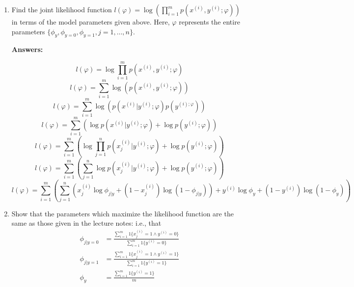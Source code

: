 \documentclass[a4paper,14pt]{article}
\begin{document}
\begin{enumerate}[label=(\alph*)]
    \item Find the joint likelihood function $l(\varphi) = \log \left(\prod_{i=1}^{m}p(x^{(i)},y^{(i)};\varphi) \right)$ in terms of 
    the model parameters given above. Here, $\varphi$ represents the entire parameters $\{\phi_{y},\phi_{y=0},\phi_{y=1},j=1,\dots,n\}$.

\textbf{Answers:}

\begin{equation}
    l(\varphi) = \log \prod_{i=1}^{m} p(x^{(i)},y^{(i)};\varphi)
\end{equation}
\begin{equation}
    l(\varphi) = \sum_{i=1}^{m} \log\left(p(x^{(i)},y^{(i)};\varphi)\right)
\end{equation}
\begin{equation}
    l(\varphi) = \sum_{i=1}^{m} \log\left(p(x^{(i)}|y^{(i)};\varphi)p(y^{(i);\varphi})\right)
\end{equation}
\begin{equation}
    l(\varphi) = \sum_{i=1}^{m} \left( \log p(x^{(i)}|y^{(i)};\varphi)+ \log p(y^{(i)};\varphi) \right)
\end{equation}
\begin{equation}
    l(\varphi) = \sum_{i=1}^{m} \left( \log \prod_{j=1}^{n}p(x_{j}^{(i)}|y^{(i)};\varphi)+ \log p(y^{(i)};\varphi) \right)
\end{equation}
\begin{equation}
    l(\varphi) = \sum_{i=1}^{m} \left( \sum_{j=1}^{n} \log p(x_{j}^{(i)}|y^{(i)};\varphi)+ \log p(y^{(i)};\varphi) \right)
\end{equation}
\begin{equation}
    l(\varphi) = \sum_{i=1}^{m} \left( \sum_{j=1}^{n} \left(x_{j}^{(i)}\log \phi_{j|y} +(1-x_{j}^{(i)})\log(1-\phi_{j|y}) \right)
    + y^{(i)}\log \phi_{y} + (1-y^{(i)})\log(1-\phi_{y}) \right)
\end{equation}

    \item Show that the parameters which maximize the likelihood function are the same as those given in the lecture notes: i.e., that
    \begin{align*}
        \phi_{j|y=0} &= \frac{\sum_{i=1}^{m} 1\{x_{j}^{(i)} = 1 \wedge y^{(i)} = 0\}}{\sum_{i=1}^{m} 1\{y^{(i)} = 0\}}\\
        \phi_{j|y=1} &= \frac{\sum_{i=1}^{m} 1\{x_{j}^{(i)} = 1 \wedge y^{(i)} = 1\}}{\sum_{i=1}^{m} 1\{y^{(i)} = 1\}}\\
        \phi_{y} &= \frac{\sum_{i=1}^{m} 1\{y^{(i)} = 1\}}{m}
    \end{align*}


\end{enumerate}
\end{document}
